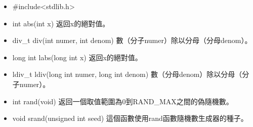 \begin{itemize}
    \item #include<stdlib.h>
    
    \item int abs(int x) 返回x的絕對值。
    \item div_t div(int numer, int denom) 數（分子numer）除以分母（分母denom）。
    \item long int labs(long int x) 返回x的絕對值。
    \item ldiv_t ldiv(long int numer, long int denom) 數（分母denom）除以分母（分子numer）。
    \item int rand(void) 返回一個取值範圍為0到RAND_MAX之間的偽隨機數。
    \item void srand(unsigned int seed) 這個函數使用rand函數隨機數生成器的種子。
    \end{itemize}